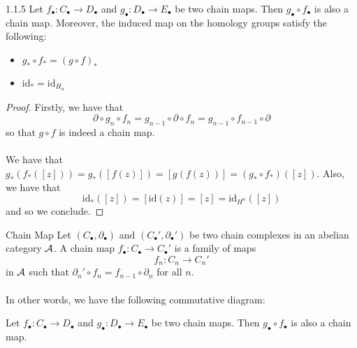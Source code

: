 \documentclass[a4paper]{article}
\begin{document}
\begin{prp}{}{1.1.5} Let $f_\bullet:C_\bullet\to D_\bullet$ and $g_\bullet:D_\bullet\to E_\bullet$ be two chain maps. Then $g_\bullet\circ f_\bullet$ is also a chain map. Moreover, the induced map on the homology groups satisfy the following: 
\begin{itemize}
\item $g_\ast\circ f_\ast=(g\circ f)_\ast$
\item $\text{id}_\ast=\text{id}_{H_n}$
\end{itemize} \tcbline
\begin{proof}
Firstly, we have that $$\partial\circ g_n\circ f_n=g_{n-1}\circ\partial\circ f_n=g_{n-1}\circ f_{n-1}\circ\partial$$ so that $g\circ f$ is indeed a chain map. \\~\\

We have that $g_\ast(f_\ast([z]))=g_\ast([f(z)])=[g(f(z))]=(g_\ast\circ f_\ast)([z])$. Also, we have that $$\text{id}_\ast([z])=[\text{id}(z)]=[z]=\text{id}_{H^n}([z])$$ and so we conclude. 
\end{proof}
\end{prp}

\begin{defn}{Chain Map}{} Let $(C_\bullet,\partial_\bullet)$ and $(C_\bullet',\partial_\bullet')$ be two chain complexes in an abelian category $\mathcal{A}$. A chain map $f_\bullet:C_\bullet\to C_\bullet'$ is a family of maps $$f_n:C_n\to C_n'$$ in $\mathcal{A}$ such that $\partial_n'\circ f_n=f_{n-1}\circ\partial_n$ for all $n$. \\~\\
In other words, we have the following commutative diagram: \\
\end{defn}

\begin{prp}{}{} Let $f_\bullet:C_\bullet\to D_\bullet$ and $g_\bullet:D_\bullet\to E_\bullet$ be two chain maps. Then $g_\bullet\circ f_\bullet$ is also a chain map. \tcbline
\end{prp}
\end{document}
